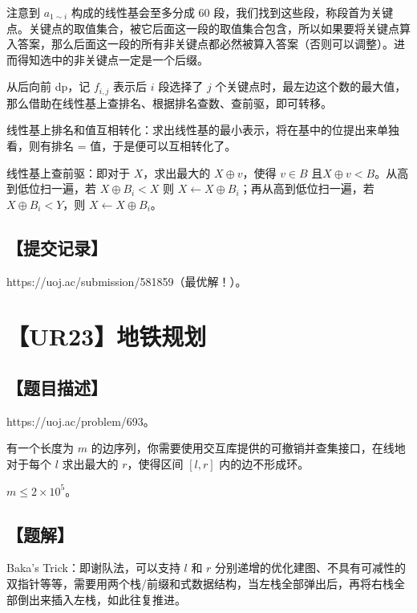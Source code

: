 \documentclass[UTF8,12pt,a4paper]{ctexart}
\begin{document}
	注意到 $a_{1\sim i}$ 构成的线性基会至多分成 $60$ 段，我们找到这些段，称段首为关键点。关键点的取值集合，被它后面这一段的取值集合包含，所以如果要将关键点算入答案，那么后面这一段的所有非关键点都必然被算入答案（否则可以调整）。进而得知选中的非关键点一定是一个后缀。
	
	从后向前 dp，记 $f_{i,j}$ 表示后 $i$ 段选择了 $j$ 个关键点时，最左边这个数的最大值，那么借助在线性基上查排名、根据排名查数、查前驱，即可转移。
	
	线性基上排名和值互相转化：求出线性基的最小表示，将在基中的位提出来单独看，则有排名 = 值，于是便可以互相转化了。
	
	线性基上查前驱：即对于 $X$，求出最大的 $X\oplus v$，使得 $v\in B$ 且$X\oplus v < B$。从高到低位扫一遍，若 $X\oplus B_i<X$ 则 $X\leftarrow X\oplus B_i$；再从高到低位扫一遍，若 $X\oplus B_i<Y$，则 $X\leftarrow X\oplus B_i$。
	
	\subsection*{【提交记录】}
	
	https://uoj.ac/submission/581859（最优解！）。
	
	
	\section*{【UR23】地铁规划}
	
	\subsection*{【题目描述】}
	
	https://uoj.ac/problem/693。
	
	有一个长度为 $m$ 的边序列，你需要使用交互库提供的可撤销并查集接口，在线地对于每个 $l$ 求出最大的 $r$，使得区间 $[l,r]$ 内的边不形成环。
	
	$m\le 2\times 10^5$。
	
	\subsection*{【题解】}
	
	Baka's Trick：即谢队法，可以支持 $l$ 和 $r$ 分别递增的优化建图、不具有可减性的双指针等等，需要用两个栈/前缀和式数据结构，当左栈全部弹出后，再将右栈全部倒出来插入左栈，如此往复推进。
	
\end{document}
